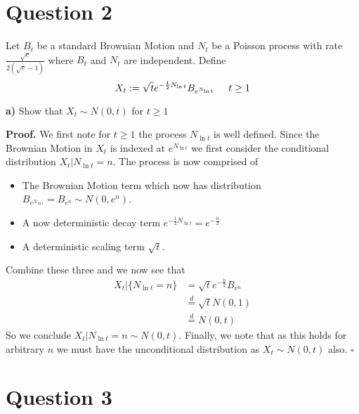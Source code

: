\documentclass{article}
\begin{document}
\newpage
\section{Question 2}

\begin{tcolorbox}
[colframe=black,colback=gray!5,boxrule=0.5pt]
Let $B_t$ be a standard Brownian Motion and $N_t$ be a Poisson process with rate $\frac{\sqrt{e}}{2(\sqrt{e}- 1)}$ where $B_t$ and $N_t$ are independent. Define 
$$X_t := \sqrt{t} e^{-\frac{1}{2}N_{\ln t}} B_{e^{N_{\ln t}}} \hspace{5mm} t\geq 1$$
\end{tcolorbox}


\begin{tcolorbox}
[colframe=black,colback=gray!5,boxrule=0.5pt]
\textbf{a)} Show that $X_t \sim N(0,t)$ for $t\geq 1$
\end{tcolorbox}
\textbf{Proof.} We first note for $t\geq1$ the process $N_{\ln t}$ is well defined. Since the Brownian Motion in $X_t$ is indexed at $e^{N_{\ln t}}$ we first consider the conditional distribution $X_t | N_{\ln t} =n$. The process is now comprised of
\begin{itemize}
    \item The Brownian Motion term which now has distribution $B_{e^{N_{\ln t}}} = B_{e^n} \sim N(0, e^n)$. 
    \item A now deterministic decay term $e^{-\frac{1}{2}N_{\ln t}} = e^{-\frac{n}{2} }$
    \item A deterministic scaling term $\sqrt{t}$.
\end{itemize}
Combine these three and we now see that 
\begin{align*}
    X_t | \{N_{\ln t} = n\} &= \sqrt{t}e^{-\frac{n}{2}}B_{e^n} \\
    &\stackrel{d}{=} \sqrt{t} N(0,1) \\
    &\stackrel{d}{=} N(0,t)
\end{align*}
So we conclude $X_{t} | N_{\ln t}=n\sim N(0, t).$ Finally, we note that as this holds for arbitrary $n$ we must have the unconditional distribution as $X_t \sim N(0, t)$ also. $\square$


\newpage
\section{Question 3}


\newpage
 
\end{document}
